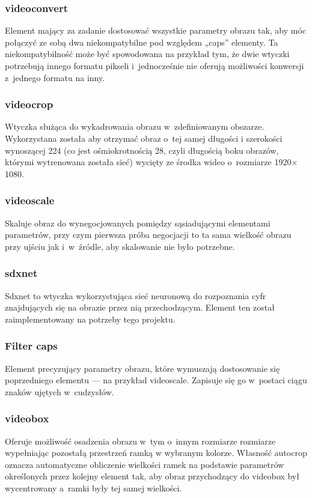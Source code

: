 \documentclass[12pt, oneside, a4paper]{article}
\begin{document}
\subsubsection{videoconvert}\label{sec:videoconvert}
Element mający za zadanie dostosować wszystkie parametry obrazu tak,
aby móc połączyć ze sobą dwa niekompatybilne pod względem „caps” elementy.
Ta niekompatybilność może być spowodowana na przykład tym, że dwie
wtyczki potrzebują innego formatu pikseli i~jednocześnie nie oferują
możliwości konwersji z~jednego formatu na inny.

\subsubsection{videocrop}\label{sec:videocrop}
Wtyczka służąca do wykadrowania obrazu w~zdefiniowanym obszarze.
Wykorzystana została aby otrzymać obraz o~tej samej długości
i szerokości wynoszącej 224 (co jest ośmiokrotnością 28, czyli
długością boku obrazów, którymi wytrenowana została sieć) wycięty
ze środka wideo o~rozmiarze 1920\(\times \)1080.

\subsubsection{videoscale}\label{sec:videoscale}
Skaluje obraz do wynegocjowanych pomiędzy sąsiadującymi elementami
parametrów, przy czym pierwsza próba negocjacji to ta sama wielkość
obrazu przy ujściu jak i~w~źródle, aby skalowanie nie było potrzebne.

\subsubsection{sdxnet}\label{sec:sdxnet}
Sdxnet to wtyczka wykorzystująca sieć neuronową do rozpoznania cyfr
znajdujących się na obrazie przez nią przechodzącym. Element ten został
zaimplementowany na potrzeby tego projektu.

\subsubsection{Filter caps}\label{sec:Filter caps}
Element precyzujący parametry obrazu, które wymuszają
dostosowanie się poprzedniego elementu --- na przykład videoscale.
Zapisuje się go w~postaci ciągu znaków ujętych w~cudzysłów.

\subsubsection{videobox}\label{sec:videobox}
Oferuje możliwość osadzenia obrazu w~tym o~innym rozmiarze
rozmiarze wypełniając pozostałą przestrzeń ramką
w wybranym kolorze. Własność autocrop oznacza automatyczne obliczenie
wielkości ramek na podstawie parametrów określonych przez kolejny element tak,
aby obraz przychodzący do videobox był wycentrowany a~ramki
były tej samej wielkości.
\end{document}
